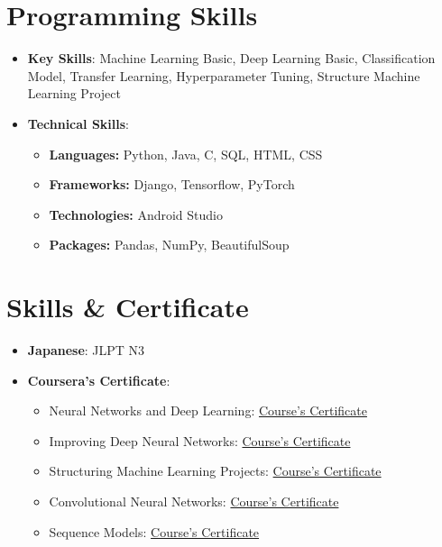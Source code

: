 \documentclass[letterpaper,11pt]{article}
\newcommand{\resumeSubHeadingListStart}{\begin{itemize}[leftmargin=*]}
\newcommand{\resumeSubHeadingListEnd}{\end{itemize}}
\begin{document}
\section{Programming Skills}
 \resumeSubHeadingListStart
   \item \textbf{Key Skills}{: Machine Learning Basic, Deep Learning Basic, Classification Model, Transfer Learning, Hyperparameter Tuning, Structure Machine Learning Project}
   \item \textbf{Technical Skills}{:}
    \begin{itemize}
   	 \item \textbf{Languages: }Python, Java, C, SQL, HTML, CSS
   	 \item \textbf{Frameworks: }Django, Tensorflow, PyTorch
   	 \item \textbf{Technologies: }Android Studio
   	 \item \textbf{Packages: }Pandas, NumPy, BeautifulSoup
   	\end{itemize}
 \resumeSubHeadingListEnd


\section{Skills \& Certificate}
 \resumeSubHeadingListStart
   \item \textbf{Japanese}{: JLPT N3}
   \item \textbf{Coursera's Certificate}{: }
   	\begin{itemize}
   	 \item Neural Networks and Deep Learning: \href{https://www.coursera.org/account/accomplishments/verify/3SV6ZM83PAPY}{Course's Certificate}
   	 \item Improving Deep Neural Networks: \href{https://www.coursera.org/account/accomplishments/verify/K7R7RXN6Q7SV}{Course's Certificate}
   	 \item Structuring Machine Learning Projects: \href{https://www.coursera.org/account/accomplishments/verify/LDATR4NBCUGX}{Course's Certificate}
   	 \item Convolutional Neural Networks: \href{https://www.coursera.org/account/accomplishments/verify/V5T79CX4DHVH}{Course's Certificate}
   	 \item Sequence Models: \href{https://coursera.org/share/9426110071f6af536da81856863076c5}{Course's Certificate}
   	\end{itemize}
 \resumeSubHeadingListEnd


\end{document}
